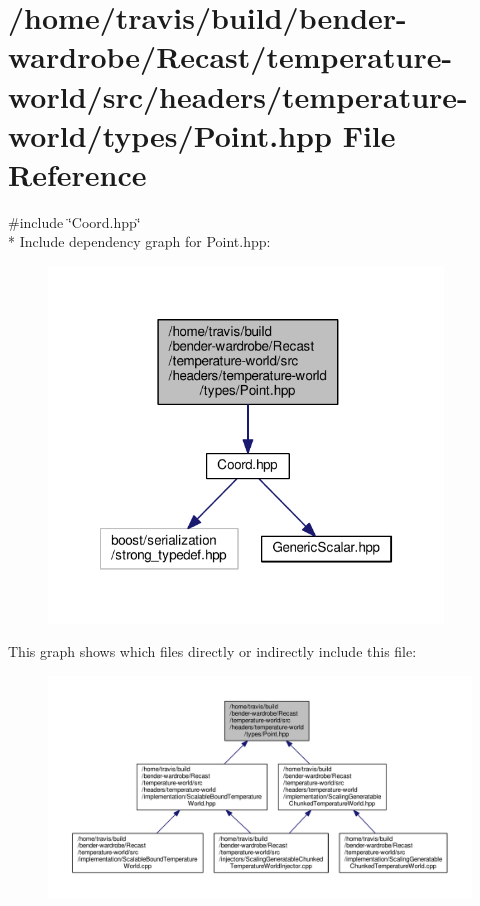 \hypertarget{temperature-world_2src_2headers_2temperature-world_2types_2_point_8hpp}{\section{/home/travis/build/bender-\/wardrobe/\-Recast/temperature-\/world/src/headers/temperature-\/world/types/\-Point.hpp File Reference}
\label{temperature-world_2src_2headers_2temperature-world_2types_2_point_8hpp}
}
{\ttfamily \#include \char`\"{}Coord.\-hpp\char`\"{}}\\*
Include dependency graph for Point.\-hpp\-:
\nopagebreak
\begin{figure}[H]
\begin{center}
\leavevmode
\includegraphics[width=297pt]{temperature-world_2src_2headers_2temperature-world_2types_2_point_8hpp__incl}
\end{center}
\end{figure}
This graph shows which files directly or indirectly include this file\-:
\nopagebreak
\begin{figure}[H]
\begin{center}
\leavevmode
\includegraphics[width=350pt]{temperature-world_2src_2headers_2temperature-world_2types_2_point_8hpp__dep__incl}
\end{center}
\end{figure}
